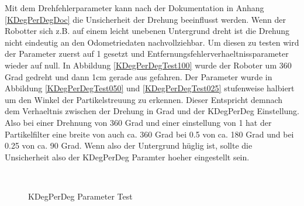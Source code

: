 \documentclass{article}
\begin{document}
Mit dem Drehfehlerparameter kann nach der Dokumentation in Anhang \ref{KDegPerDegDoc} die Unsicherheit der Drehung beeinflusst werden. Wenn der Robotter sich z.B. auf einem leicht unebenen Untergrund dreht ist die Drehung nicht eindeutig an den Odometriedaten nachvollziehbar. 
Um diesen zu testen wird der Parameter zuerst auf 1 gesetzt und Entfernungsfehlerverhaeltnissparameter wieder auf null.
In Abbildung \ref{KDegPerDegTest100} wurde der Roboter um 360 Grad gedreht und dann 1cm gerade aus gefahren. Der Parameter wurde in Abbildung \ref{KDegPerDegTest050} und \ref{KDegPerDegTest025} stufenweise halbiert um den Winkel der Partikelstreuung zu erkennen. Dieser Entspricht demnach dem Verhaeltnis zwischen der Drehung in Grad und der KDegPerDeg Einstellung. Also bei einer Drehnung von 360 Grad und einer einstellung von 1 hat der Partikelfilter eine breite von auch ca. 360 Grad bei 0.5 von ca. 180 Grad und bei 0.25 von ca. 90 Grad. Wenn also der Untergrund h\"uglig ist, sollte die Unsicherheit also der KDegPerDeg Paramter hoeher eingestellt sein. 


\begin{figure}
  \centering
  \ 
  \ 
  \caption{KDegPerDeg Parameter Test}
  \label{KDegPerDegTestFigure}
\end{figure}
\end{document}
